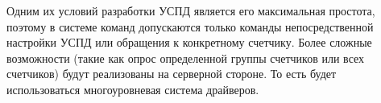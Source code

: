 Одним их условий разработки УСПД является его максимальная простота\cite{tz}, поэтому в системе команд допускаются только команды непосредственной настройки УСПД или обращения к конкретному счетчику. Более сложные возможности (такие как опрос определенной группы счетчиков или всех счетчиков) будут реализованы на серверной стороне. То есть будет использоваться многоуровневая система драйверов.

